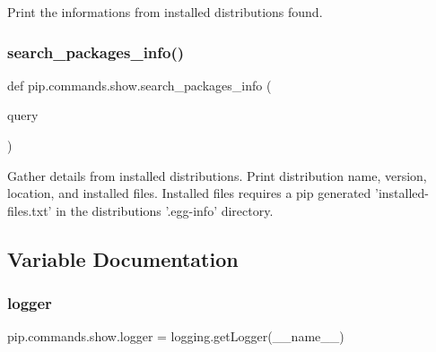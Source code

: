 \begin{DoxyVerb}Print the informations from installed distributions found.
\end{DoxyVerb}
 \mbox{\label{namespacepip_1_1commands_1_1show_afd8a3b42fbe9b5e1f7c0b1f301ed08e0}} 
\subsubsection{\texorpdfstring{search\+\_\+packages\+\_\+info()}{search\_packages\_info()}}
{\footnotesize\ttfamily def pip.\+commands.\+show.\+search\+\_\+packages\+\_\+info (\begin{DoxyParamCaption}\item[{}]{query }\end{DoxyParamCaption})}

\begin{DoxyVerb}Gather details from installed distributions. Print distribution name,
version, location, and installed files. Installed files requires a
pip generated 'installed-files.txt' in the distributions '.egg-info'
directory.
\end{DoxyVerb}
 

\subsection{Variable Documentation}
\mbox{\label{namespacepip_1_1commands_1_1show_a991cd0a12d0cc7cc33b9c012859df7ca}} 
\subsubsection{\texorpdfstring{logger}{logger}}
{\footnotesize\ttfamily pip.\+commands.\+show.\+logger = logging.\+get\+Logger(\+\_\+\+\_\+name\+\_\+\+\_\+)}

